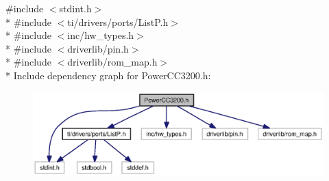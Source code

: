{\ttfamily \#include $<$stdint.\+h$>$}\\*
{\ttfamily \#include $<$ti/drivers/ports/\+List\+P.\+h$>$}\\*
{\ttfamily \#include $<$inc/hw\+\_\+types.\+h$>$}\\*
{\ttfamily \#include $<$driverlib/pin.\+h$>$}\\*
{\ttfamily \#include $<$driverlib/rom\+\_\+map.\+h$>$}\\*
Include dependency graph for Power\+C\+C3200.\+h\+:
\nopagebreak
\begin{figure}[H]
\begin{center}
\leavevmode
\includegraphics[width=350pt]{_power_c_c3200_8h__incl}
\end{center}
\end{figure}
